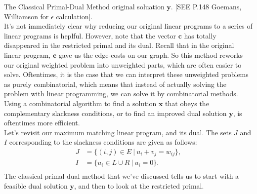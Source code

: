 \documentclass[11pt]{article}
\renewcommand{\'}{^{'}}
\begin{document}
\begin{section}{The Classical Primal-Dual Method}
	original soluation $\mathbf{y}$. [SEE P.148 Goemans, Williamson for $\epsilon$ calculation].\\
	It's not immediately clear why reducing our original linear programs to a series of linear 
	programs is heplful. However,  note that the vector $\mathbf{c}$ has totally disappeared in 
	the restricted primal and its dual. Recall that in the original linear program, $\mathbf{c}$ 
	gave us the edge-costs on our graph. So this method reworks our original weighted problem 
	into unweighted parts, which are often easier to solve. Oftentimes, it is the case that 
	we can interpret these unweighted problems as purely combinatorial, which means that instead 
	of actually solving the problem with linear programming, we can solve it by combinatorial 
	methods. Using a combinatorial algorithm to find a solution $\mathbf{x}$ that obeys the 
	complementary slackness conditions, or to find an improved dual solution $\mathbf{y}$, is 
	oftentimes more efficient.\\
	Let's revisit our maximum matching linear program, and its dual. The sets $J$ and $I$ 
	corresponding to the slackness conditions are given as follows:
	\begin{align}
		J &= \{(i,j)\in E\ |\ u_i + v_j = w_{ij}\}, \\
		I &= \{u_i \in L\cup R\ |\ u_i = 0\}. \\
	\end{align}
	The classical primal dual method that we've discussed tells us to start with a feasible 
	dual solution $\mathbf{y}$, and then to look at the restricted primal.
\end{section}
\end{document}
